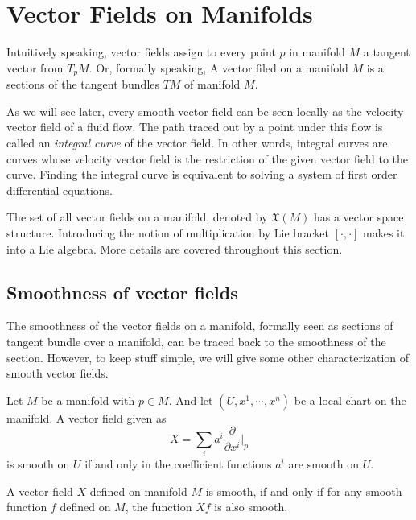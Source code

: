 \section{Vector Fields on Manifolds}
Intuitively speaking, vector fields assign to every point $ p $ in manifold $ M $ a tangent vector from $ T_pM $. Or, formally speaking, A vector filed on a manifold $ M $ is a sections of the tangent bundles $ TM $ of manifold $ M $.

As we will see later, every smooth vector field can be seen locally as the velocity vector field of a fluid flow. The path traced out by a point under this flow is called an \emph{integral curve} of the vector field. In other words, integral curves are curves whose velocity vector field is the restriction of the given vector field to the curve. Finding the integral curve is equivalent to solving a system of first order differential equations.

The set of all vector fields on a manifold, denoted by $ \mathfrak{X}(M) $ has a vector space structure. Introducing the notion of multiplication by Lie bracket $ [\cdot,\cdot] $ makes it into a Lie algebra. More details are covered throughout this section.

\subsection{Smoothness of vector fields}
The smoothness of the vector fields on a manifold, formally seen as sections of tangent bundle over a manifold, can be traced back to the smoothness of the section. However, to keep stuff simple, we will give some other characterization of smooth vector fields.

\begin{proposition}
	Let $ M $ be a manifold with $ p \in M $. And let $ (U,x^1,\cdots,x^n) $ be a local chart on the manifold. A vector field given as
	\[ X = \sum_i a^i \frac{\partial}{\partial  x^i}\big|_{p} \] 
	is smooth on $ U $ if and only in the coefficient functions $ a^i $ are smooth on $ U $.
\end{proposition}

\begin{proposition}
	A vector field $ X $ defined on manifold $ M $ is smooth, if and only if for any smooth function $ f $ defined on $ M $, the function $ Xf $ is also smooth.
\end{proposition}

